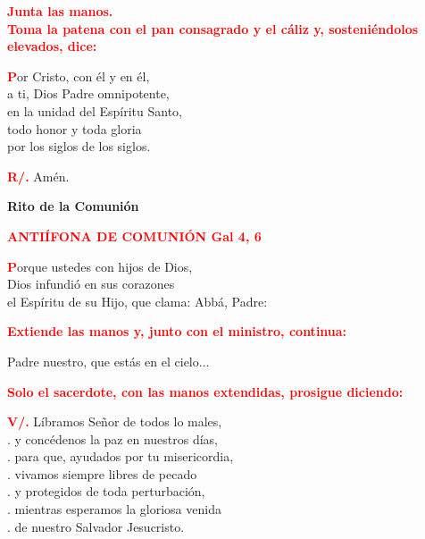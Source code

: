 \documentclass[12pt, letterpaper, spanish]{report}
\begin{document}
\large{\bfseries \textcolor{red}{Junta las manos.\\
Toma la patena con el pan consagrado y el c\'aliz y, sosteni\'endolos elevados, dice:}} \newline

\lettrine{\bfseries \textcolor{red}{P}}{}or Cristo, con \'el y en \'el,\\
a ti, Dios Padre omnipotente,\\
en la unidad del Esp\'iritu Santo,\\
todo honor y toda gloria\\
por los siglos de los siglos.\newline

\Large \hspace{-0.9cm} {\bfseries \textcolor{red}{R/.}} \hspace{0.5cm} Am\'en.\newline

\begin{center}
\Huge {\bfseries Rito de la Comuni\'on}
\end{center}

\Large {\bfseries \textcolor{red}{ANTI\'IFONA DE COMUNI\'ON \hspace{2cm} \large Gal 4, 6}} \newline

\Large \lettrine{\bfseries \textcolor{red}{P}}{}orque ustedes con hijos de Dios,\\
Dios infundi\'o en sus corazones\\
el Esp\'iritu de su Hijo, que clama: Abb\'a, Padre:\newline

\large{\bfseries \textcolor{red}{Extiende las manos y, junto con el ministro, continua:}}\newline

\Large Padre nuestro, que est\'as en el cielo...\newline

\large{\bfseries \textcolor{red}{Solo el sacerdote, con las manos extendidas, prosigue diciendo:}}\newline

\Large \hspace{-0.9cm} {\bfseries \textcolor{red}{V/.}} \hspace{0.5cm} L\'ibramos Se\~nor de todos lo males,\\
.\hspace{1.5cm} y conc\'edenos la paz en nuestros d\'ias,\\
.\hspace{1.5cm} para que, ayudados por tu misericordia,\\
.\hspace{1.5cm} vivamos siempre libres de pecado\\
.\hspace{1.5cm} y protegidos de toda perturbaci\'on,\\
.\hspace{1.5cm} mientras esperamos la gloriosa venida\\
.\hspace{1.5cm} de nuestro Salvador Jesucristo.\newline
\end{document}
